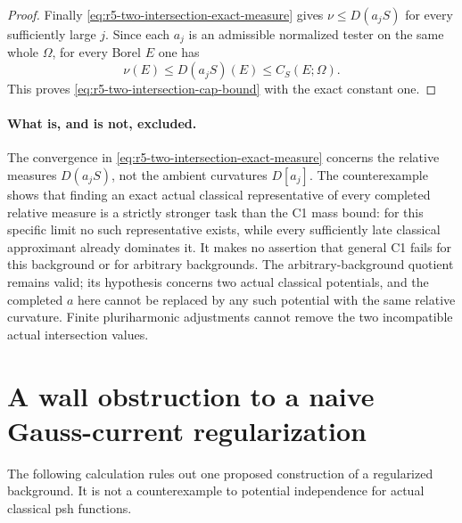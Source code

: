 \documentclass[11pt,a4paper]{article}
\numberwithin{equation}{section}
\theoremstyle{definition}
\theoremstyle{remark}
\begin{document}
\begin{proof}
Finally \eqref{eq:r5-two-intersection-exact-measure} gives
$\nu\le D(a_jS)$ for every sufficiently large $j$.
Since each $a_j$ is an admissible normalized tester on the
same whole $\Omega$, for every Borel $E$ one has
\[
                  \nu(E)\le D(a_jS)(E)\le C_S(E;\Omega).
\]
This proves \eqref{eq:r5-two-intersection-cap-bound} with the
exact constant one.
\end{proof}

\paragraph{What is, and is not, excluded.}
The convergence in \eqref{eq:r5-two-intersection-exact-measure}
concerns the relative measures $D(a_jS)$, not the ambient
curvatures $D[a_j]$.  The counterexample shows that finding an
exact actual classical representative of every completed
relative measure is a strictly stronger task than the C1
mass bound: for this specific limit no such representative
exists, while every sufficiently late classical approximant
already dominates it.  It makes no assertion that general
C1 fails for this background or for arbitrary backgrounds.
The arbitrary-background quotient remains valid; its
hypothesis concerns two actual classical potentials, and the
completed $a$ here cannot be replaced by any such potential
with the same relative curvature.  Finite pluriharmonic
adjustments cannot remove the two incompatible actual
intersection values.



\section{A wall obstruction to a naive Gauss-current regularization}
\label{sec:r5-gauss-pushforward-obstruction}

The following calculation rules out one proposed construction of a
regularized background.  It is not a counterexample to potential
independence for actual classical psh functions.
\end{document}
